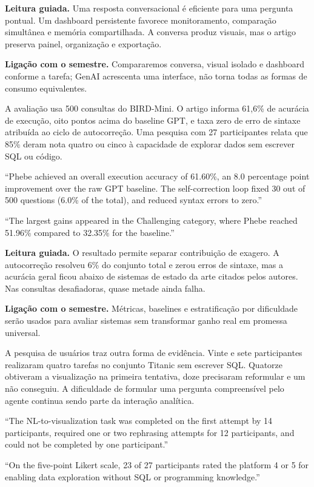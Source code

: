 \noindent\textbf{Leitura guiada.} Uma resposta conversacional é eficiente para uma pergunta pontual. Um dashboard persistente favorece monitoramento, comparação simultânea e memória compartilhada. A conversa produz visuais, mas o artigo preserva painel, organização e exportação.

\noindent\textbf{Ligação com o semestre.} Compararemos conversa, visual isolado e dashboard conforme a tarefa; GenAI acrescenta uma interface, não torna todas as formas de consumo equivalentes.

A avaliação usa 500 consultas do BIRD-Mini. O artigo informa 61,6\% de acurácia de execução, oito pontos acima do baseline GPT, e taxa zero de erro de sintaxe atribuída ao ciclo de autocorreção. Uma pesquisa com 27 participantes relata que 85\% deram nota quatro ou cinco à capacidade de explorar dados sem escrever SQL ou código.

\begin{ArticleBox}
``Phebe achieved an overall execution accuracy of 61.60\%, an 8.0 percentage point improvement over the raw GPT baseline. The self-correction loop fixed 30 out of 500 questions (6.0\% of the total), and reduced syntax errors to zero.''

``The largest gains appeared in the Challenging category, where Phebe reached 51.96\% compared to 32.35\% for the baseline.''
\end{ArticleBox}

\noindent\textbf{Leitura guiada.} O resultado permite separar contribuição de exagero. A autocorreção resolveu 6\% do conjunto total e zerou erros de sintaxe, mas a acurácia geral ficou abaixo de sistemas de estado da arte citados pelos autores. Nas consultas desafiadoras, quase metade ainda falha.

\noindent\textbf{Ligação com o semestre.} Métricas, baselines e estratificação por dificuldade serão usados para avaliar sistemas sem transformar ganho real em promessa universal.

A pesquisa de usuários traz outra forma de evidência. Vinte e sete participantes realizaram quatro tarefas no conjunto Titanic sem escrever SQL. Quatorze obtiveram a visualização na primeira tentativa, doze precisaram reformular e um não conseguiu. A dificuldade de formular uma pergunta compreensível pelo agente continua sendo parte da interação analítica.

\begin{ArticleBox}
``The NL-to-visualization task was completed on the first attempt by 14 participants, required one or two rephrasing attempts for 12 participants, and could not be completed by one participant.''

``On the five-point Likert scale, 23 of 27 participants rated the platform 4 or 5 for enabling data exploration without SQL or programming knowledge.''
\end{ArticleBox}

